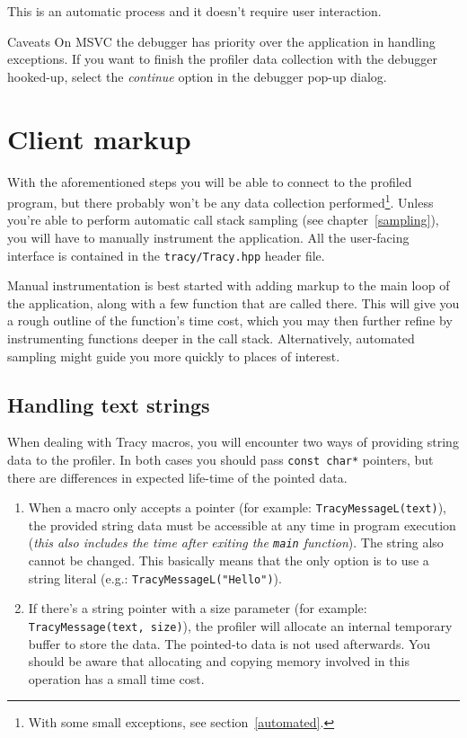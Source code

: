 \documentclass[hidelinks,titlepage,a4paper]{article}
\begin{document}
This is an automatic process and it doesn't require user interaction.

\begin{bclogo}[
noborder=true,
couleur=black!5,
logo=\bcattention
]{Caveats}
On MSVC the debugger has priority over the application in handling exceptions. If you want to finish the profiler data collection with the debugger hooked-up, select the \emph{continue} option in the debugger pop-up dialog.
\end{bclogo}

\section{Client markup}
\label{client}

With the aforementioned steps you will be able to connect to the profiled program, but there probably won't be any data collection performed\footnote{With some small exceptions, see section~\ref{automated}.}. Unless you're able to perform automatic call stack sampling (see chapter~\ref{sampling}), you will have to manually instrument the application. All the user-facing interface is contained in the \texttt{tracy/Tracy.hpp} header file.

Manual instrumentation is best started with adding markup to the main loop of the application, along with a few function that are called there. This will give you a rough outline of the function's time cost, which you may then further refine by instrumenting functions deeper in the call stack. Alternatively, automated sampling might guide you more quickly to places of interest.

\subsection{Handling text strings}

When dealing with Tracy macros, you will encounter two ways of providing string data to the profiler. In both cases you should pass \texttt{const char*} pointers, but there are differences in expected life-time of the pointed data.

\begin{enumerate}
\item When a macro only accepts a pointer (for example: \texttt{TracyMessageL(text)}), the provided string data must be accessible at any time in program execution (\emph{this also includes the time after exiting the \texttt{main} function}). The string also cannot be changed. This basically means that the only option is to use a string literal (e.g.: \texttt{TracyMessageL("Hello")}).

\item If there's a string pointer with a size parameter (for example: \texttt{TracyMessage(text, size)}), the profiler will allocate an internal temporary buffer to store the data. The pointed-to data is not used afterwards. You should be aware that allocating and copying memory involved in this operation has a small time cost.
\end{enumerate}
\end{document}
